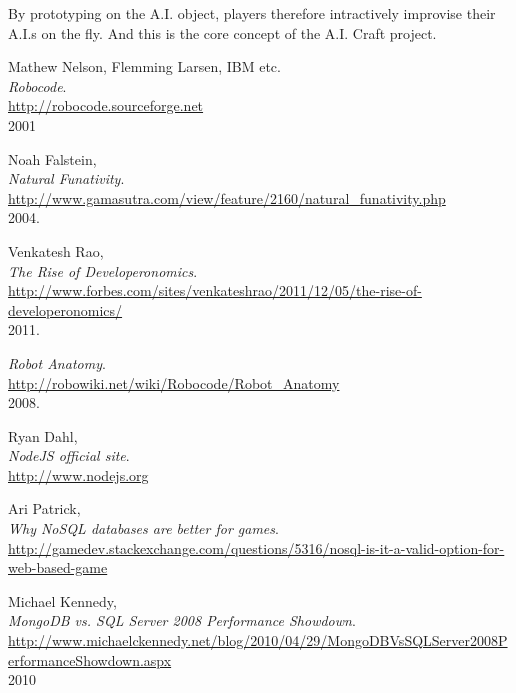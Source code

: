 \documentclass[12pt]{article}
\begin{document}
By prototyping on the A.I. object, players therefore intractively improvise their A.I.s on the fly. And this is the core concept of the A.I. Craft project.\\

\begin{thebibliography}{9}

	Mathew Nelson, Flemming Larsen, IBM etc.\\
	\emph{Robocode}.\\
	\url{http://robocode.sourceforge.net}\\
	2001

	Noah Falstein,\\
	\emph{Natural Funativity}.\\
	\url{http://www.gamasutra.com/view/feature/2160/natural\_funativity.php}\\
	2004.

	Venkatesh Rao,\\
	\emph{The Rise of Developeronomics}.\\
	\url{http://www.forbes.com/sites/venkateshrao/2011/12/05/the-rise-of-developeronomics/}\\
	2011.

	\emph{Robot Anatomy}. \\
	\url{http://robowiki.net/wiki/Robocode/Robot\_Anatomy}\\
	2008.

	Ryan Dahl,\\
	\emph{NodeJS official site}.\\
	\url{http://www.nodejs.org}

	Ari Patrick,\\
	\emph{Why NoSQL databases are better for games}.\\
	\url{http://gamedev.stackexchange.com/questions/5316/nosql-is-it-a-valid-option-for-web-based-game}

	Michael Kennedy,\\
	\emph{MongoDB vs. SQL Server 2008 Performance Showdown}.\\
	\url{http://www.michaelckennedy.net/blog/2010/04/29/MongoDBVsSQLServer2008PerformanceShowdown.aspx}\\
	2010

\end{thebibliography}

	
\end{document}

